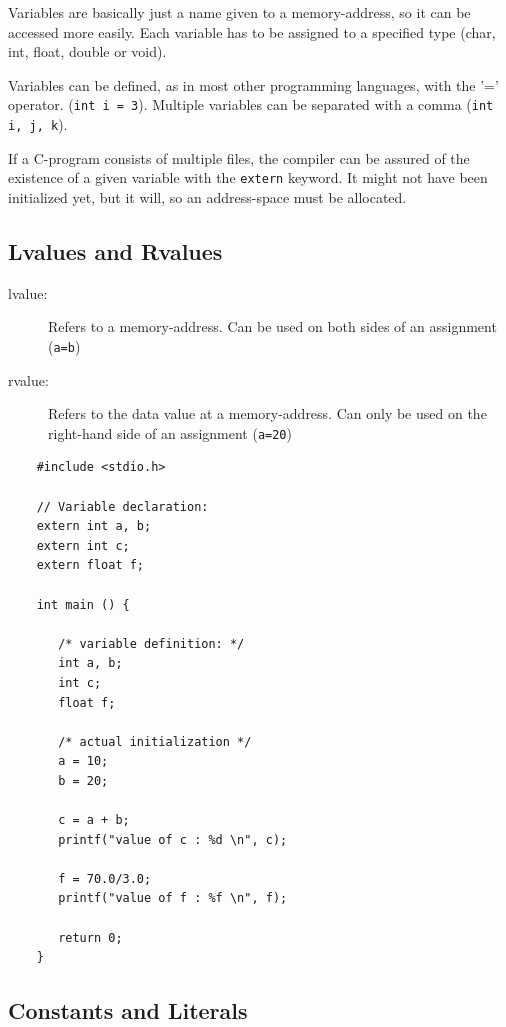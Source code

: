 \documentclass[a4paper, 11pt]{article}
\newcommand{\code}[1]{\texttt{#1}}
\begin{document}
\begin{minipage}{0.50\textwidth}
    Variables are basically just a name given to a memory-address, so it can be accessed more easily. Each variable has to be assigned to a specified type (char, int, float, double or void). 

    Variables can be defined, as in most other programming languages, with the '=' operator. (\code{int i = 3}). Multiple variables can be separated with a comma (\code{int i, j, k}). 

    If a C-program consists of multiple files, the compiler can be assured of the existence of a given variable with the \code{extern} keyword. It might not have been initialized yet, but it will, so an address-space must be allocated. 

    \subsection{Lvalues and Rvalues}

    \begin{description}
        \item[lvalue: ] Refers to a memory-address. Can be used on both sides of an assignment (\code{a=b})
        \item[rvalue: ] Refers to the data value at a memory-address. Can only be used on the right-hand side of an assignment (\code{a=20})
    \end{description}
\end{minipage}\hfill
\begin{minipage}{0.45\textwidth}
    \begin{lstlisting}
    #include <stdio.h>

    // Variable declaration:
    extern int a, b;
    extern int c;
    extern float f;

    int main () {

       /* variable definition: */
       int a, b;
       int c;
       float f;

       /* actual initialization */
       a = 10;
       b = 20;

       c = a + b;
       printf("value of c : %d \n", c);

       f = 70.0/3.0;
       printf("value of f : %f \n", f);

       return 0;
    }
    \end{lstlisting}
\end{minipage}

\subsection{Constants and Literals}
\end{document}
